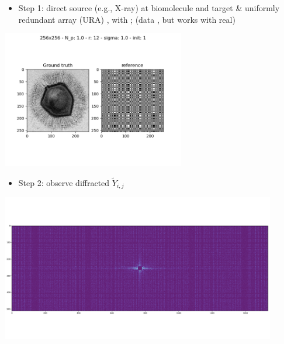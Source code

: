 \documentclass[9pt]{report}
\begin{document}
\begin{itemize}
\item \small Step 1: direct  source (e.g., X-ray) at
  biomolecule and target \& uniformly redundant array (URA)
  , with ; (data
  , but works with real)
\end{itemize}
\vspace*{-8pt}
\begin{center}
  \includegraphics[width=0.6\textwidth]{img/fft/truth-ref.png}
\end{center}


\vspace*{-2pt}
\begin{itemize}
\item \small Step 2: observe diffracted  $\tilde{Y}_{i,j}$
\end{itemize}
\vspace*{-8pt}
\begin{center}
  \includegraphics[width=0.9\textwidth]{img/fft/observed.png}
\end{center}
\end{document}
